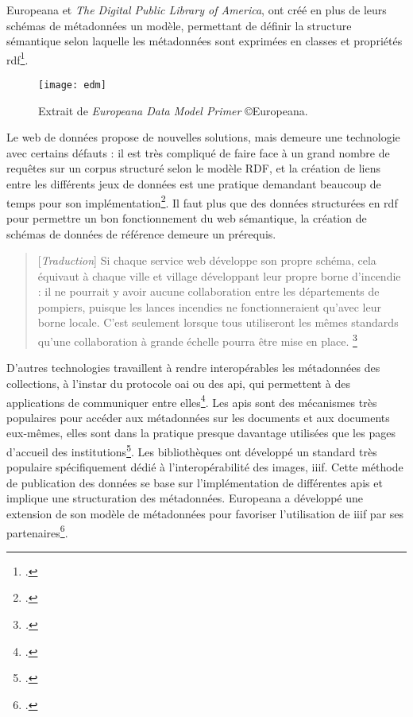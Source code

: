  Europeana et  \textit{The Digital Public Library of America}, ont créé en plus de leurs schémas de métadonnées un modèle, permettant de définir la structure sémantique selon laquelle les métadonnées sont exprimées en classes et propriétés \gls{rdf}\footcite{bermes_web_2013}.

\begin{figure}[H]%
\centering
\texttt{[image: edm]}
\caption{Extrait de \textit{Europeana Data Model Primer} ©Europeana.}
\end{figure}

Le web de données propose de nouvelles solutions, mais demeure une technologie avec certains défauts : il est très compliqué de faire face à un grand nombre de requêtes sur un corpus structuré selon le modèle RDF, et la création de liens entre les différents jeux de données est une pratique demandant beaucoup de temps pour son implémentation\footcite{rasmussen_pennington_connecting_2019}. Il faut plus que des données structurées en \gls{rdf} pour permettre un bon fonctionnement du web sémantique, la création de schémas de données de référence demeure un prérequis.
\begin{quotation}
[\textit{Traduction}]
Si chaque service web développe son propre schéma, cela équivaut à chaque ville et village développant leur propre borne d'incendie : il ne pourrait y avoir aucune collaboration entre les départements de pompiers, puisque les lances incendies ne fonctionneraient qu'avec leur borne locale. C'est seulement lorsque tous utiliseront les mêmes standards qu'une collaboration à grande échelle pourra être mise en place. \footnote{\textit{\cite[p.186]{pomerantz_metadata_2015}.}}
\end{quotation}

D'autres technologies travaillent à rendre interopérables les métadonnées des collections, à l'instar du protocole \gls{oai} ou des \gls{api}, qui permettent à des applications de communiquer entre elles\footcite{bermes_web_2013}. Les \gls{api}s sont des mécanismes très populaires pour accéder aux métadonnées sur les documents et aux documents eux-mêmes, elles sont dans la pratique presque davantage utilisées que les pages d'accueil des institutions\footcite{pomerantz_metadata_2015}. Les bibliothèques ont développé un standard très populaire spécifiquement dédié à l'interopérabilité des images, \gls{iiif}. Cette méthode de publication des données se base sur l'implémentation de différentes \gls{api}s et implique une structuration des métadonnées. Europeana a développé une extension de son modèle de métadonnées pour favoriser l'utilisation de \gls{iiif} par ses partenaires\footcite{iiif_consortium_home_nodate}.


